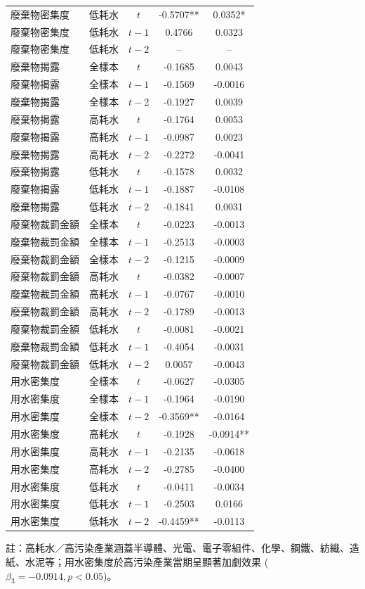 \documentclass[12pt,a4paper]{article}
\begin{document}
\begin{table}[H]
\begin{threeparttable}
\begin{tabular}{llccc}
廢棄物密集度 & 低耗水 & $t$ & -0.5707** & 0.0352* \\
廢棄物密集度 & 低耗水 & $t-1$ & 0.4766 & 0.0323 \\
廢棄物密集度 & 低耗水 & $t-2$ & -- & -- \\
廢棄物揭露 & 全樣本 & $t$ & -0.1685 & 0.0043 \\
廢棄物揭露 & 全樣本 & $t-1$ & -0.1569 & -0.0016 \\
廢棄物揭露 & 全樣本 & $t-2$ & -0.1927 & 0.0039 \\
廢棄物揭露 & 高耗水 & $t$ & -0.1764 & 0.0053 \\
廢棄物揭露 & 高耗水 & $t-1$ & -0.0987 & 0.0023 \\
廢棄物揭露 & 高耗水 & $t-2$ & -0.2272 & -0.0041 \\
廢棄物揭露 & 低耗水 & $t$ & -0.1578 & 0.0032 \\
廢棄物揭露 & 低耗水 & $t-1$ & -0.1887 & -0.0108 \\
廢棄物揭露 & 低耗水 & $t-2$ & -0.1841 & 0.0031 \\
廢棄物裁罰金額 & 全樣本 & $t$ & -0.0223 & -0.0013 \\
廢棄物裁罰金額 & 全樣本 & $t-1$ & -0.2513 & -0.0003 \\
廢棄物裁罰金額 & 全樣本 & $t-2$ & -0.1215 & -0.0009 \\
廢棄物裁罰金額 & 高耗水 & $t$ & -0.0382 & -0.0007 \\
廢棄物裁罰金額 & 高耗水 & $t-1$ & -0.0767 & -0.0010 \\
廢棄物裁罰金額 & 高耗水 & $t-2$ & -0.1789 & -0.0013 \\
廢棄物裁罰金額 & 低耗水 & $t$ & -0.0081 & -0.0021 \\
廢棄物裁罰金額 & 低耗水 & $t-1$ & -0.4054 & -0.0031 \\
廢棄物裁罰金額 & 低耗水 & $t-2$ & 0.0057 & -0.0043 \\
用水密集度 & 全樣本 & $t$ & -0.0627 & -0.0305 \\
用水密集度 & 全樣本 & $t-1$ & -0.1964 & -0.0190 \\
用水密集度 & 全樣本 & $t-2$ & -0.3569** & -0.0164 \\
用水密集度 & 高耗水 & $t$ & -0.1928 & -0.0914** \\
用水密集度 & 高耗水 & $t-1$ & -0.2135 & -0.0618 \\
用水密集度 & 高耗水 & $t-2$ & -0.2785 & -0.0400 \\
用水密集度 & 低耗水 & $t$ & -0.0411 & -0.0034 \\
用水密集度 & 低耗水 & $t-1$ & -0.2503 & 0.0166 \\
用水密集度 & 低耗水 & $t-2$ & -0.4459** & -0.0113 \\
\bottomrule
\end{tabular}
\begin{tablenotes}
\small
\item 註：高耗水／高污染產業涵蓋半導體、光電、電子零組件、化學、鋼鐵、紡織、造紙、水泥等；用水密集度於高污染產業當期呈顯著加劇效果 ($\beta_3 = -0.0914, p < 0.05$)。
\end{tablenotes}
\end{threeparttable}
\end{table}
\end{document}
